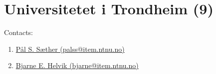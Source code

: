 \section{Universitetet i Trondheim (9)}
\label{sec:NTNU}

Contacts:
\begin{enumerate}
 \item {}\href{mailto:palss@item.ntnu.no}{Pål S. Sæther (palss@item.ntnu.no)}
 \item {}\href{mailto:bjarne@item.ntnu.no}{Bjarne E. Helvik (bjarne@item.ntnu.no)}
\end{enumerate}

